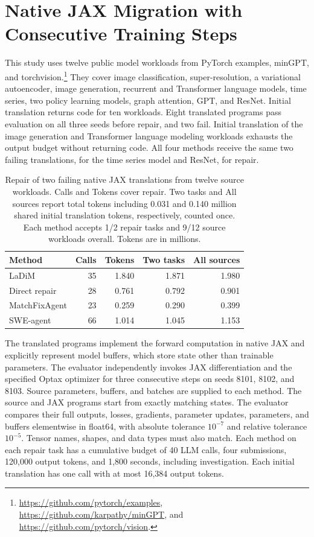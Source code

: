 \documentclass{article}
\begin{document}
\section{Native JAX Migration with Consecutive Training Steps}
\label{sec:native-jax-study}
This study uses twelve public model workloads from PyTorch examples, minGPT, and torchvision.\footnote{\url{https://github.com/pytorch/examples}, \url{https://github.com/karpathy/minGPT}, and \url{https://github.com/pytorch/vision}.} They cover image classification, super-resolution, a variational autoencoder, image generation, recurrent and Transformer language models, time series, two policy learning models, graph attention, GPT, and ResNet. Initial translation returns code for ten workloads. Eight translated programs pass evaluation on all three seeds before repair, and two fail. Initial translation of the image generation and Transformer language modeling workloads exhausts the output budget without returning code. All four methods receive the same two failing translations, for the time series model and ResNet, for repair.
\begin{table}[!htb]
\caption{Repair of two failing native JAX translations from twelve source workloads. Calls and Tokens cover repair. Two tasks and All sources report total tokens including 0.031 and 0.140 million shared initial translation tokens, respectively, counted once. Each method accepts 1/2 repair tasks and 9/12 source workloads overall. Tokens are in millions.}
\label{tab:native-jax}
\centering
\small
\setlength{\tabcolsep}{3pt}



\begin{tabular*}{\linewidth}{@{\extracolsep{\fill}}lrrrr@{}}
\toprule
\textbf{Method} & \textbf{Calls} & \textbf{Tokens} & \textbf{Two tasks} & \textbf{All sources} \\
\midrule
LaDiM & 35 & 1.840 & 1.871 & 1.980 \\
Direct repair & 28 & 0.761 & 0.792 & 0.901 \\
MatchFixAgent & 23 & 0.259 & 0.290 & 0.399 \\
SWE-agent & 66 & 1.014 & 1.045 & 1.153 \\
\bottomrule
\end{tabular*}


\end{table}
The translated programs implement the forward computation in native JAX and explicitly represent model buffers, which store state other than trainable parameters. The evaluator independently invokes JAX differentiation and the specified Optax optimizer for three consecutive steps on seeds 8101, 8102, and 8103. Source parameters, buffers, and batches are supplied to each method. The source and JAX programs start from exactly matching states. The evaluator compares their full outputs, losses, gradients, parameter updates, parameters, and buffers elementwise in float64, with absolute tolerance $10^{-7}$ and relative tolerance $10^{-5}$. Tensor names, shapes, and data types must also match. Each method on each repair task has a cumulative budget of 40 LLM calls, four submissions, 120,000 output tokens, and 1,800 seconds, including investigation. Each initial translation has one call with at most 16,384 output tokens.
\end{document}
